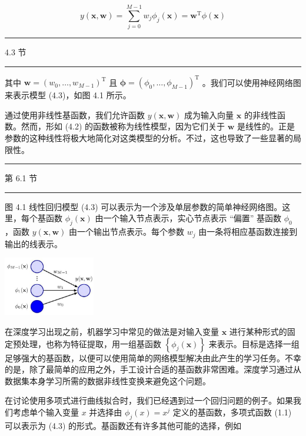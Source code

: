 \documentclass[10pt]{article}
\newcommand{\HRule}{\begin{center}\rule{0.9\linewidth}{0.2mm}\end{center}}
\begin{document}
\[
y\left( {\mathbf{x},\mathbf{w}}\right)  = \mathop{\sum }\limits_{{j = 0}}^{{M - 1}}{w}_{j}{\phi }_{j}\left( \mathbf{x}\right)  = {\mathbf{w}}^{\mathrm{T}}\phi \left( \mathbf{x}\right)  \tag{4.3}
\]

\HRule

4.3 节

\HRule

其中 \(\mathbf{w} = {\left( {w}_{0},\ldots ,{w}_{M - 1}\right) }^{\mathrm{T}}\) 且 \(\mathbf{\phi } = {\left( {\phi }_{0},\ldots ,{\phi }_{M - 1}\right) }^{\mathrm{T}}\) 。我们可以使用神经网络图来表示模型 (4.3)，如图 4.1 所示。

通过使用非线性基函数，我们允许函数 \(y\left( {\mathbf{x},\mathbf{w}}\right)\) 成为输入向量 \(\mathbf{x}\) 的非线性函数。然而，形如 (4.2) 的函数被称为线性模型，因为它们关于 \(\mathbf{w}\) 是线性的。正是参数的这种线性将极大地简化对这类模型的分析。不过，这也导致了一些显著的局限性。

\HRule

第 6.1 节

\HRule

图 4.1 线性回归模型 (4.3) 可以表示为一个涉及单层参数的简单神经网络图。这里，每个基函数 \({\phi }_{j}\left( \mathbf{x}\right)\) 由一个输入节点表示，实心节点表示 “偏置” 基函数 \({\phi }_{0}\) ，函数 \(y\left( {\mathbf{x},\mathbf{w}}\right)\) 由一个输出节点表示。每个参数 \({w}_{j}\) 由一条将相应基函数连接到输出的线表示。

\begin{center}
\includegraphics[max width=0.3\textwidth]{images/0194e279-9b28-703a-88f4-c3ac21e2010d_132_1083_345_456_293_0.jpg}
\end{center}
\hspace*{3em} 

在深度学习出现之前，机器学习中常见的做法是对输入变量 \(\mathbf{x}\) 进行某种形式的固定预处理，也称为特征提取，用一组基函数 \(\left\{  {{\phi }_{j}\left( \mathbf{x}\right) }\right\}\) 来表示。目标是选择一组足够强大的基函数，以便可以使用简单的网络模型解决由此产生的学习任务。不幸的是，除了最简单的应用之外，手工设计合适的基函数非常困难。深度学习通过从数据集本身学习所需的数据非线性变换来避免这个问题。

在讨论使用多项式进行曲线拟合时，我们已经遇到过一个回归问题的例子。如果我们考虑单个输入变量 \(x\) 并选择由 \({\phi }_{j}\left( x\right)  = {x}^{j}\) 定义的基函数，多项式函数 (1.1) 可以表示为 (4.3) 的形式。基函数还有许多其他可能的选择，例如
\end{document}
